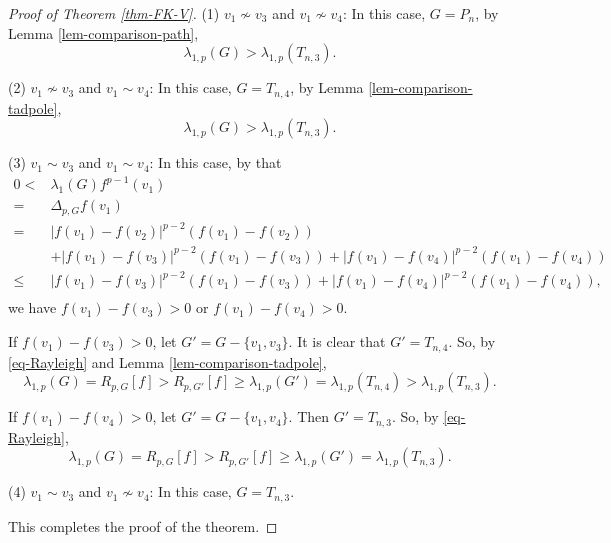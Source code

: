 \documentclass[12pt]{amsart}
\theoremstyle{definition}
\theoremstyle{remark}
\numberwithin{equation}{section}
\begin{document}
\begin{proof}[Proof of Theorem \ref{thm-FK-V}]
(1) $v_1\not\sim v_3$ and $v_1\not\sim v_4$: In this case, $G=P_n$, by Lemma \ref{lem-comparison-path}, $$\lambda_{1,p}(G)>\lambda_{1,p}(T_{n,3}).$$

(2) $v_1\not\sim v_3$ and $v_1\sim v_4$: In this case, $G=T_{n,4}$, by Lemma \ref{lem-comparison-tadpole}, $$\lambda_{1,p}(G)>\lambda_{1,p}(T_{n,3}).$$

(3) $v_1\sim v_3$ and $v_1\sim v_4$: In this case, by that
\begin{equation*}
\begin{split}
0<&\lambda_1(G) f^{p-1}(v_1)\\
=&\Delta_{p,G} f(v_1)\\
=&|f(v_1)-f(v_2)|^{p-2}(f(v_1)-f(v_2))\\
&+|f(v_1)-f(v_3)|^{p-2}(f(v_1)-f(v_3))+|f(v_1)-f(v_4)|^{p-2}(f(v_1)-f(v_4))\\
\leq&|f(v_1)-f(v_3)|^{p-2}(f(v_1)-f(v_3))+|f(v_1)-f(v_4)|^{p-2}(f(v_1)-f(v_4)),\\
\end{split}
\end{equation*}
we have $f(v_1)-f(v_3)>0$ or $f(v_1)-f(v_4)>0$.

If $f(v_1)-f(v_3)>0$, let $G'=G-\{v_1,v_3\}$. It is clear that $G'=T_{n,4}$. So, by \eqref{eq-Rayleigh} and Lemma \ref{lem-comparison-tadpole},
$$\lambda_{1,p}(G)=R_{p,G}[f]>R_{p,G'}[f]\geq \lambda_{1,p}(G')=\lambda_{1,p}(T_{n,4})>\lambda_{1,p}(T_{n,3}).$$

If $f(v_1)-f(v_4)>0$, let $G'=G-\{v_1,v_4\}.$ Then $G'=T_{n,3}$. So, by \eqref{eq-Rayleigh},
$$\lambda_{1,p}(G)=R_{p,G}[f]>R_{p,G'}[f]\geq \lambda_{1,p}(G')=\lambda_{1,p}(T_{n,3}).$$

(4) $v_1\sim v_3$ and $v_1\not\sim v_4$: In this case, $G=T_{n,3}$.

This completes the proof of the theorem.
\end{proof}
\end{document}
